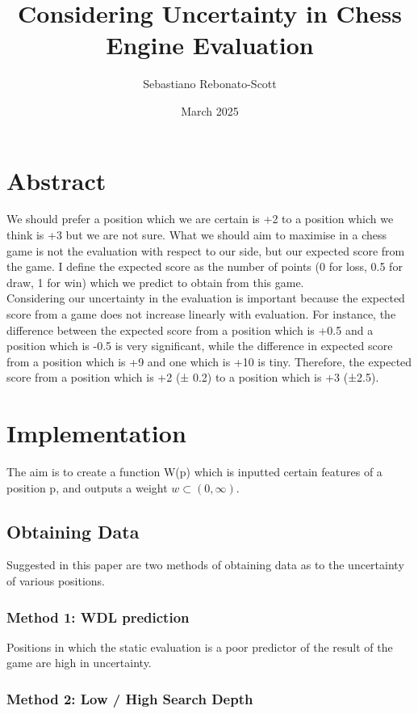 \documentclass{paper}
\title{Considering Uncertainty in Chess Engine Evaluation}
\author{Sebastiano Rebonato-Scott}
\date{March 2025}
\begin{document}
\maketitle

\section{Abstract}

We should prefer a position which we are certain is +2 to a position which we think is +3 but we are not sure. What we should aim to maximise in a chess game is not the evaluation with respect to our side, but our expected score from the game. I define the expected score as the number of points (0 for loss, 0.5 for draw, 1 for win) which we predict to obtain from this game. \\

Considering our uncertainty in the evaluation is important because the expected score from a game does not increase linearly with evaluation. For instance, the difference between the expected score from a position which is +0.5 and a position which is -0.5 is very significant, while the difference in expected score from a position which is +9 and one which is +10 is tiny. Therefore, the expected score from a position which is +2 (± 0.2) to a position which is +3 (±2.5).

\section{Implementation}

The aim is to create a function W(p) which is inputted certain features of a position p, and outputs a weight $w \subset (0, \infty)$.

\subsection{Obtaining Data}

Suggested in this paper are two methods of obtaining data as to the uncertainty of various positions.

\subsubsection{Method 1: WDL prediction}

Positions in which the static evaluation is a poor predictor of the result of the game are high in uncertainty.

\subsubsection{Method 2: Low / High Search Depth}
\end{document}
